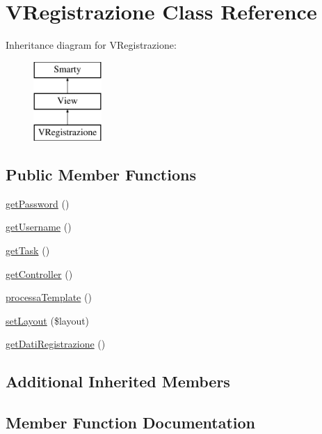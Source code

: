 \hypertarget{class_v_registrazione}{}\section{V\+Registrazione Class Reference}
\label{class_v_registrazione}
Inheritance diagram for V\+Registrazione\+:\begin{figure}[H]
\begin{center}
\leavevmode
\includegraphics[height=3.000000cm]{class_v_registrazione}
\end{center}
\end{figure}
\subsection*{Public Member Functions}
\begin{DoxyCompactItemize}
\item 
\mbox{\hyperlink{class_v_registrazione_aa9099bafae4b691c8355251bbd58799a}{get\+Password}} ()
\item 
\mbox{\hyperlink{class_v_registrazione_a4aefbbdc87649de9c8ae8c8f9d70310a}{get\+Username}} ()
\item 
\mbox{\hyperlink{class_v_registrazione_ac02dfc8636611a3b90644cfabe25cbef}{get\+Task}} ()
\item 
\mbox{\hyperlink{class_v_registrazione_ae4e9e4f3a43cd784344da08aa2042fc3}{get\+Controller}} ()
\item 
\mbox{\hyperlink{class_v_registrazione_af24b75acb63fb916d4e3d7b586aa70f5}{processa\+Template}} ()
\item 
\mbox{\hyperlink{class_v_registrazione_afacb525933c2c700abd6758f18dd2516}{set\+Layout}} (\$layout)
\item 
\mbox{\hyperlink{class_v_registrazione_a792e7b07cf747d79a28345750a0a3950}{get\+Dati\+Registrazione}} ()
\end{DoxyCompactItemize}
\subsection*{Additional Inherited Members}


\subsection{Member Function Documentation}
\mbox{\label{class_v_registrazione_ae4e9e4f3a43cd784344da08aa2042fc3}} 
